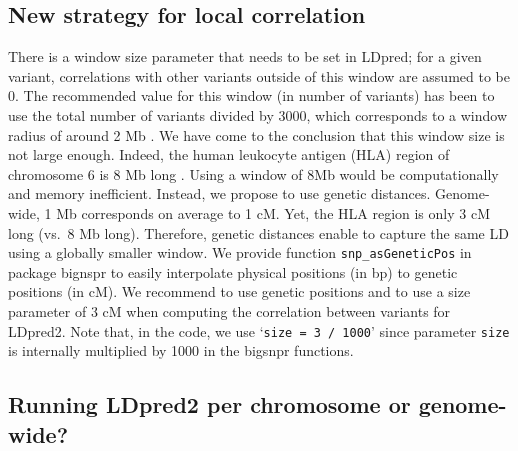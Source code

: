 \documentclass{bioinfo}
\begin{document}
\begin{methods}
\subsection*{New strategy for local correlation}

There is a window size parameter that needs to be set in LDpred; for a given variant, correlations with other variants outside of this window are assumed to be 0.
The recommended value for this window (in number of variants) has been to use the total number of variants divided by 3000, which corresponds to a window radius of around 2 Mb \cite[]{vilhjalmsson2015modeling}.
We have come to the conclusion that this window size is not large enough. Indeed, the human leukocyte antigen (HLA) region of chromosome 6 is 8 Mb long \cite[]{price2008long}. 
Using a window of 8Mb would be computationally and memory inefficient.
Instead, we propose to use genetic distances. Genome-wide, 1 Mb corresponds on average to 1 cM. Yet, the HLA region is only 3 cM long (vs.\ 8 Mb long).
Therefore, genetic distances enable to capture the same LD using a globally smaller window.
We provide function \texttt{snp\_asGeneticPos} in package bignspr to easily interpolate physical positions (in bp) to genetic positions (in cM).
We recommend to use genetic positions and to use a size parameter of 3 cM when computing the correlation between variants for LDpred2. 
Note that, in the code, we use `\texttt{size = 3 / 1000}' since parameter \texttt{size} is internally multiplied by 1000 in the bigsnpr functions.


\subsection*{Running LDpred2 per chromosome or genome-wide?}\label{sec:bychr}


\end{methods}
\end{document}
